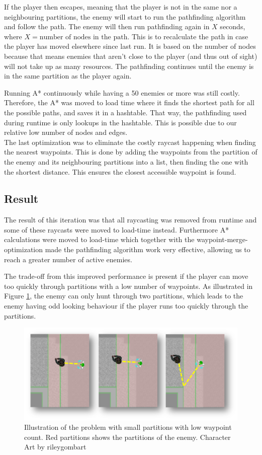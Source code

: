 If the player then escapes, meaning that the player is not in the same nor a neighbouring partitions, the enemy will start to run the pathfinding algorithm and follow the path.
The enemy will then run pathfinding again in $X$ seconds, where $X = \text{number of nodes in the path}$.
This is to recalculate the path in case the player has moved elsewhere since last run.
It is based on the number of nodes because that means enemies that aren't close to the player (and thus out of sight) will not take up as many resources.
The pathfinding continues until the enemy is in the same partition as the player again.

Running A* continuously while having a 50 enemies or more was still costly.
Therefore, the A* was moved to load time where it finds the shortest path for all the possible paths, and saves it in a hashtable.
That way, the pathfinding used during runtime is only lookups in the hashtable.
This is possible due to our relative low number of nodes and edges.\\
The last optimization was to eliminate the costly raycast happening when finding the nearest waypoints. 
This is done by adding the waypoints from the partition of the enemy and its neighbouring partitions into a list, then finding the one with the shortest distance. 
This ensures the closest accessible waypoint is found.

\subsection*{Result}
The result of this iteration was that all raycasting was removed from runtime and some of these raycasts were moved to load-time instead.
Furthermore A* calculations were moved to load-time which together with the waypoint-merge-optimization made the pathfinding algorithm work very effective, allowing us to reach a greater number of active enemies.

The trade-off from this improved performance is present if the player can move too quickly through partitions with a low number of waypoints.
As illustrated in Figure \ref{tradeoff}, the enemy can only hunt through two partitions, which leads to the enemy having odd looking behaviour if the player runs too quickly through the partitions.
\begin{figure}[H]
\begin{center}
        \includegraphics[width=\textwidth]{figures/astar/tradeoff.png}
    \caption{Illustration of the problem with small partitions with low waypoint count. Red partitions shows the partitions of the enemy. Character Art by rileygombart\cite{artist}}\label{tradeoff}
\end{center}
\end{figure}